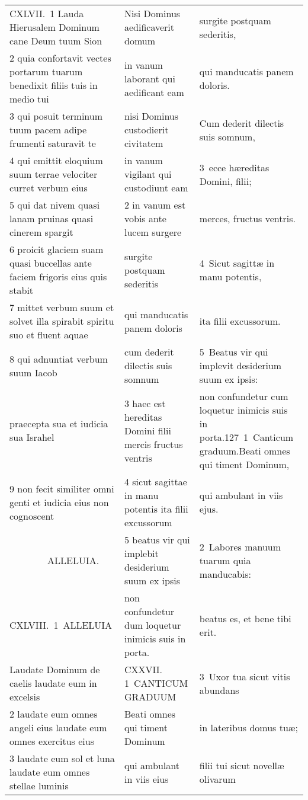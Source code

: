 \documentclass{article}
\begin{document}
\begin{longtable}{@{}p{}p{}p{}@{}}
CXLVII. 1 Lauda Hierusalem Dominum cane Deum tuum Sion	&	Nisi Dominus aedificaverit domum	&	surgite postquam sederitis,	\\
2 quia confortavit vectes portarum tuarum benedixit filiis tuis in medio tui	&	in vanum laborant qui aedificant eam	&	qui manducatis panem doloris.	\\
3 qui posuit terminum tuum pacem adipe frumenti saturavit te	&	nisi Dominus custodierit civitatem	&	Cum dederit dilectis suis somnum,	\\
4 qui emittit eloquium suum terrae velociter curret verbum eius	&	in vanum vigilant qui custodiunt eam	&	3 ecce hæreditas Domini, filii;	\\
5 qui dat nivem quasi lanam pruinas quasi cinerem spargit	&	2 in vanum est vobis ante lucem surgere	&	merces, fructus ventris.	\\
6 proicit glaciem suam quasi buccellas ante faciem frigoris eius quis stabit	&	surgite postquam sederitis	&	4 Sicut sagittæ in manu potentis,	\\
7 mittet verbum suum et solvet illa spirabit spiritu suo et fluent aquae	&	qui manducatis panem doloris	&	ita filii excussorum.	\\
8 qui adnuntiat verbum suum Iacob	&	cum dederit dilectis suis somnum	&	5 Beatus vir qui implevit desiderium suum ex ipsis:	\\
praecepta sua et iudicia sua Israhel	&	3 haec est hereditas Domini filii mercis fructus ventris	&	non confundetur cum loquetur inimicis suis in porta.127 1 Canticum graduum.Beati omnes qui timent Dominum,	\\
9 non fecit similiter omni genti et iudicia eius non cognoscent	&	4 sicut sagittae in manu potentis ita filii excussorum	&	qui ambulant in viis ejus.	\\
    ALLELUIA.	&	5 beatus vir qui implebit desiderium suum ex ipsis	&	2 Labores manuum tuarum quia manducabis:	\\
CXLVIII. 1 ALLELUIA	&	non confundetur dum loquetur inimicis suis in porta.	&	beatus es, et bene tibi erit.	\\
Laudate Dominum de caelis laudate eum in excelsis	&	CXXVII. 1 CANTICUM GRADUUM	&	3 Uxor tua sicut vitis abundans	\\
2 laudate eum omnes angeli eius laudate eum omnes exercitus eius	&	Beati omnes qui timent Dominum	&	in lateribus domus tuæ;	\\
3 laudate eum sol et luna laudate eum omnes stellae luminis	&	qui ambulant in viis eius	&	filii tui sicut novellæ olivarum	\\

\end{longtable}
\end{document}
